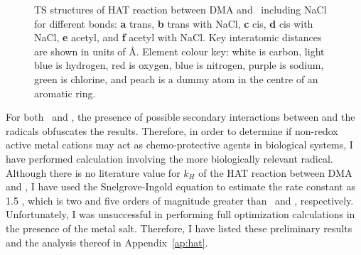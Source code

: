 \begin{doublespace}
\begin{figure}[!htbp]\ContinuedFloat
  \setcounter{subfigure}{4}

  \caption[TS structures of HAT reaction between DMA and \bno\ including
  NaCl.]{TS structures of HAT reaction between DMA and \bno\ including NaCl for
  different  bonds: \textbf{a} trans, \textbf{b} trans with NaCl,
  \textbf{c} cis, \textbf{d} cis with NaCl, \textbf{e} acetyl, and \textbf{f}
  acetyl with NaCl. Key interatomic distances are shown in units of \AA.
  Element colour key: white is carbon, light blue is hydrogen, red is oxygen,
  blue is nitrogen, purple is sodium, green is chlorine, and peach is a dummy
  atom in the centre of an aromatic ring.} \label{fig:dma-bno-ts}
\end{figure}

For both \cumo\ and \bno, the presence of possible secondary interactions
between  and the radicals obfuscates the results. Therefore, in order
to determine if non-redox active metal cations may act as chemo-protective
agents in biological systems, I have performed calculation involving the more
biologically relevant  radical. Although there is no literature value
for $k_H$ of the HAT reaction between DMA and , I have used the
Snelgrove-Ingold equation\cite{Snelgrove2001} to estimate the rate constant as
1.5 \Ms, which is two and five orders of magnitude greater than \bno\ and
\cumo, respectively. Unfortunately, I was unsuccessful in performing full
optimization calculations in the presence of the metal salt. Therefore, I have
listed these preliminary results and the analysis thereof in
Appendix~\ref{ap:hat}.



\end{doublespace}
